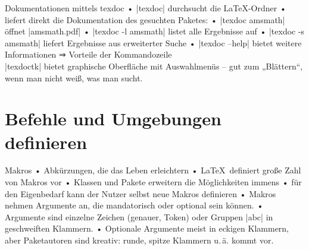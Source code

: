 \begin{frame}[fragile]{Dokumentationen mittels texdoc}
• |texdoc| durchsucht die \LaTeX-Ordner
• liefert direkt die Dokumentation des gesuchten Paketes:
• |texdoc amsmath| öffnet |amsmath.pdf|
• |texdoc -l amsmath| listet alle Ergebnisse auf
• |texdoc -s amsmath| liefert Ergebnisse aus erweiterter Suche
• |texdoc --help| bietet weitere Informationen%
\•
⇒ Vorteile der Kommandozeile\\[2em]
|texdoctk| bietet graphische Oberfläche mit Auswahlmenüs – gut zum „Blättern“, wenn man nicht weiß, was man sucht.
\end{frame}

\section{Befehle und Umgebungen definieren}
\begin{frame}[fragile]{Makros}
• Abkürzungen, die das Leben erleichtern
• \LaTeX\ definiert große Zahl von Makros vor
• Klassen und Pakete erweitern die Möglichkeiten immens
• für den Eigenbedarf kann der Nutzer selbst neue Makros definieren
• Makros nehmen Argumente an, die mandatorisch oder optional sein können.
• Argumente sind einzelne Zeichen (genauer, Token) oder Gruppen |{abc}| in geschweiften Klammern.
• Optionale Argumente meist in eckigen Klammern, aber Paketautoren sind kreativ: runde, spitze Klammern u.\,ä. kommt vor.
\•
\end{frame}


